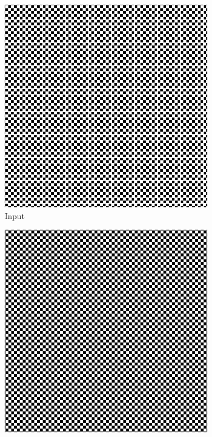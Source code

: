 \documentclass[12pt,a4paper]{article}
\begin{document}
        \begin{figure}[H]
            \centering
            \begin{subfigure}{0.2\textwidth}
                \includegraphics[width=\textwidth]{images/samples/aliasing-3-input.png}
                \caption*{Input}
            \end{subfigure}
            \enspace
            \begin{subfigure}{0.2\textwidth}
                \includegraphics[width=\textwidth]{images/samples/aliasing-3-orig.png}

\end{subfigure}
\end{figure}
\end{document}
